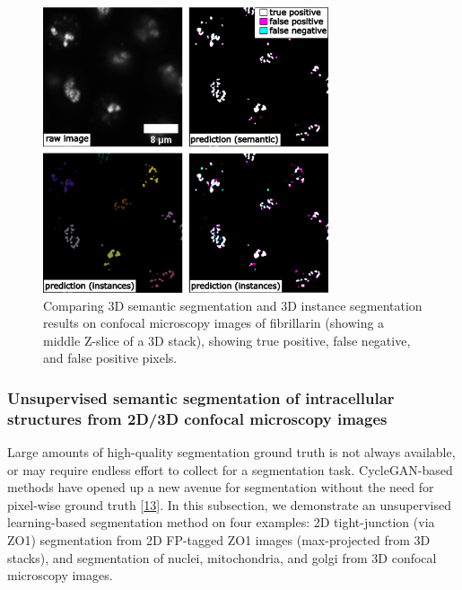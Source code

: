 \begin{figure}
\hypertarget{fig:3dseg}{%
\centering
\includegraphics[width=0.75\textwidth,height=\textheight]{images/semantic_seg3d_justin.png}
\caption{Comparing 3D semantic segmentation and 3D instance segmentation results on confocal microscopy images of fibrillarin (showing a middle Z-slice of a 3D stack), showing true positive, false negative, and false positive pixels.}\label{fig:3dseg}
}
\end{figure}

\hypertarget{unsupervised-semantic-segmentation-of-intracellular-structures-from-2d3d-confocal-microscopy-images}{%
\subsubsection{Unsupervised semantic segmentation of intracellular structures from 2D/3D confocal microscopy images}\label{unsupervised-semantic-segmentation-of-intracellular-structures-from-2d3d-confocal-microscopy-images}}

Large amounts of high-quality segmentation ground truth is not always available, or may require endless effort to collect for a segmentation task. CycleGAN-based methods have opened up a new avenue for segmentation without the need for pixel-wise ground truth {[}\protect\hyperlink{ref-RuFP3CS3}{13}{]}. In this subsection, we demonstrate an unsupervised learning-based segmentation method on four examples: 2D tight-junction (via ZO1) segmentation from 2D FP-tagged ZO1 images (max-projected from 3D stacks), and segmentation of nuclei, mitochondria, and golgi from 3D confocal microscopy images.

